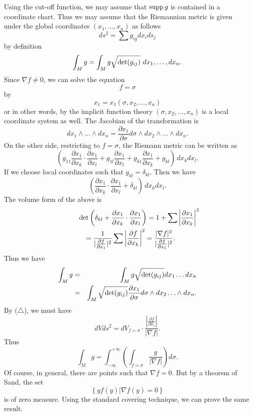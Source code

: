 Using the cut-off function, we may assume that $ {\rm supp}\,  g $ is contained in a coordinate chart. Thus we may assume that the Riemannian metric is given under the global coordinates $(x_1, \ldots, x _n) $ as follows 
%
\[ d s^2 = \sum g _{ig} d x _i ds _j \]
%
by definition  
%
\[ \int _M g = \int_M g \sqrt{{\rm det} (g _{ij} ) } \ dx_1, \ldots, dx _n. \]
%
Since $ \nabla f \neq 0 $, we can solve the equation 
%
\[ f = \sigma \]
%
by 
%
\[ x_1 = x_1 (\sigma , x_2, \ldots, x_n) \]
or in other words, by the implicit function theory $ (\sigma, x_2 , \ldots, x_n ) $ is a local coordinate system as well. The Jacobian of the transformation is 
%
\[ d x_1 \wedge \ldots \wedge d x _n = \frac{\partial x _1}{\partial \sigma} d \sigma \wedge d x_2 \wedge \ldots \wedge d x_n .\]
On the other side, restricting to $ f = \sigma $, the Riemann metric can be written as 
%
\[\left(g_{11} \frac{\partial x _1}{\partial x_k} \cdot \frac{\partial x _1}{\partial x_l} + g_{1l} \frac{\partial x _1}{\partial x_l } + g _{k1} \frac{\partial x _1}{\partial x_k} + g _{kl}\right) \, d x _k d x _l.\]
%
If we choose local coordinates such that $ g_{kl} = \delta _{kl} $. Then we have 
%
\[\left( \frac{\partial x _1}{\partial x_k} \cdot \frac{\partial x _1}{\partial x_l} + \delta _{kl} \right) \, d x_k dx_l .\]
%
The volume form of the above is 
%
\begin{eqnarray*} 
\lefteqn{{\rm det} \left( \delta _{kl} + \frac{\partial x _1}{\partial x_k} \cdot \frac{\partial x _1}{\partial x_l} \right) = 1 + \sum \left|\frac{\partial x _1}{\partial x_k}\right| ^2}\\
&& = \frac{1}{| \frac{\partial f}{\partial x_1}|^2} \sum\left|\frac{\partial f}{\partial x_k}\right|^2 = \frac{|\nabla f |^2}{ | \frac{\partial f}{\partial x_1} | ^2} .
\end{eqnarray*}
%
Thus we have 
%
\begin{eqnarray*}
\int_M g & = & \int_M g \sqrt{{\rm det} (g_{ij})} d x _1 \ldots d x _n \\
 &= & \int_M \sqrt{{\rm det} (g_{ij})} \frac{\partial x_1}{\partial \sigma} d \sigma  \wedge d x_2 \ldots \wedge d x _n .
\end{eqnarray*}
%
By ($\triangle$), we must have  
%
\[ d V ds^2 = d V _{f = \sigma} \cdot  \frac{     \left|\frac{{\partial f }}{{\partial x_i}}\right|}{| \nabla f |}      .\]
%
Thus
%
\[ \int_M g = \int ^{+ \infty}_{-\infty} \left( \int _{f=\sigma} \frac{g}{|\nabla f|}\right) d \sigma. \]
Of course, in general, there are points such that $ \nabla f = 0 $. But by a theorem of Sand, the set 
%
\[ \left\{ yf(y) | \nabla f (y) = 0 \right\} \]
%
is of zero measure. Using the standard covering technique, we can prove the same result.

